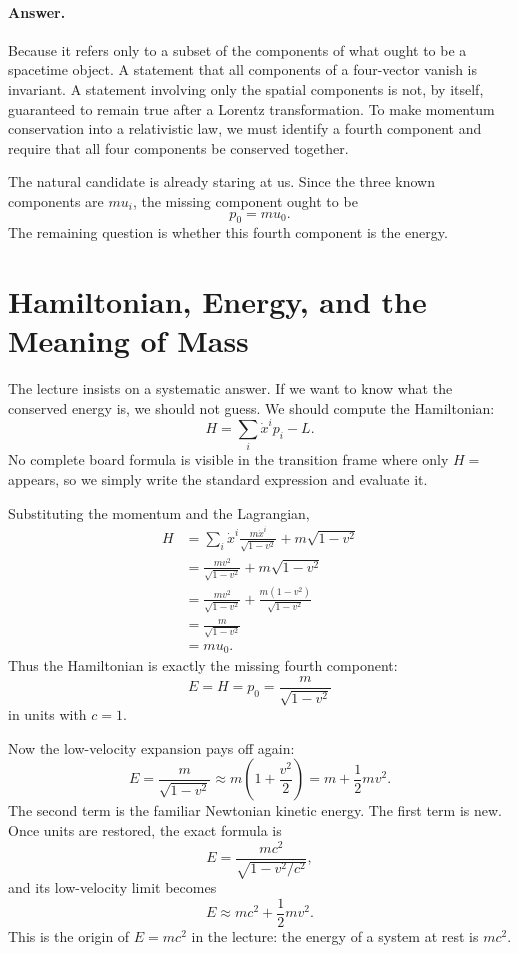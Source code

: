 \paragraph{Answer.}
Because it refers only to a subset of the components of what ought to be a spacetime object. A statement that all components of a four-vector vanish is invariant. A statement involving only the spatial components is not, by itself, guaranteed to remain true after a Lorentz transformation. To make momentum conservation into a relativistic law, we must identify a fourth component and require that all four components be conserved together.

The natural candidate is already staring at us. Since the three known components are \(m u_i\), the missing component ought to be
\begin{equation}
p_0 = m u_0.
\end{equation}
The remaining question is whether this fourth component is the energy.

\section{Hamiltonian, Energy, and the Meaning of Mass}

The lecture insists on a systematic answer. If we want to know what the conserved energy is, we should not guess. We should compute the Hamiltonian:
\begin{equation}
H=\sum_i \dot x^i p_i-L.
\end{equation}
No complete board formula is visible in the transition frame where only \(H=\) appears, so we simply write the standard expression and evaluate it.

Substituting the momentum and the Lagrangian,
\begin{align}
H
&=
\sum_i \dot x^i \frac{m\dot x^i}{\sqrt{1-v^2}} + m\sqrt{1-v^2} \\
&=
\frac{m v^2}{\sqrt{1-v^2}} + m\sqrt{1-v^2} \\
&=
\frac{m v^2}{\sqrt{1-v^2}} + \frac{m(1-v^2)}{\sqrt{1-v^2}} \\
&=
\frac{m}{\sqrt{1-v^2}} \\
&=
m u_0.
\end{align}
Thus the Hamiltonian is exactly the missing fourth component:
\begin{equation}
E=H=p_0=\frac{m}{\sqrt{1-v^2}}
\end{equation}
in units with \(c=1\).

Now the low-velocity expansion pays off again:
\begin{equation}
E
=
\frac{m}{\sqrt{1-v^2}}
\approx
m\left(1+\frac{v^2}{2}\right)
=
m+\frac12 mv^2.
\end{equation}
The second term is the familiar Newtonian kinetic energy. The first term is new. Once units are restored, the exact formula is
\begin{equation}
E=\frac{mc^2}{\sqrt{1-v^2/c^2}},
\end{equation}
and its low-velocity limit becomes
\begin{equation}
E\approx mc^2+\frac12 mv^2.
\end{equation}
This is the origin of \(E=mc^2\) in the lecture: the energy of a system at rest is \(mc^2\).

